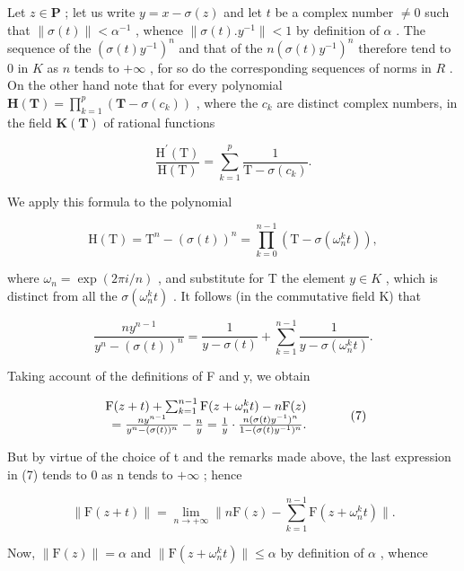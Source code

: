 Let \(z \in \mathbf{P}\) ; let us write \(y = x - \sigma(z)\) and let \(t\) be a complex number \(\neq 0\) such that \(\| \sigma(t) \| < \alpha^{-1}\) , whence \(\| \sigma(t).y^{-1} \| < 1\) by definition of \(\alpha\) . The sequence of the \((\sigma(t)y^{-1})^n\) and that of the \(n(\sigma(t)y^{-1})^n\) therefore tend to 0 in \(K\) as \(n\) tends to \(+\infty\) , for so do the corresponding sequences of norms in \(R\) . On the other hand note that for every polynomial \(\mathbf{H}(\mathbf{T}) = \prod_{k=1}^{p} (\mathbf{T} - \sigma(c_k))\) , where the \(c_k\) are distinct complex numbers, in the field \(\mathbf{K}(\mathbf{T})\) of rational functions

\[
\frac {\mathrm{H} ^ {\prime} (\mathrm{T})}{\mathrm{H} (\mathrm{T})} = \sum_ {k = 1} ^ {p} \frac {1}{\mathrm{T} - \sigma (c _ {k})}.\tag{5}
\]

We apply this formula to the polynomial

\[
\mathrm{H} (\mathrm{T}) = \mathrm{T} ^ {n} - (\sigma (t)) ^ {n} = \prod_ {k = 0} ^ {n - 1} \left(\mathrm{T} - \sigma \left(\omega_ {n} ^ {k} t\right)\right),
\]

where \(\omega_{n}=\exp(2\pi i/n)\) , and substitute for T the element \(y\in K\) , which is distinct from all the \(\sigma(\omega_{n}^{k}t)\) . It follows (in the commutative field K) that

\[
\frac {n y ^ {n - 1}}{y ^ {n} - (\sigma (t)) ^ {n}} = \frac {1}{y - \sigma (t)} + \sum_ {k = 1} ^ {n - 1} \frac {1}{y - \sigma \left(\omega_ {n} ^ {k} t\right)}.\tag{6}
\]

Taking account of the definitions of F and y, we obtain

\[
\begin{array}{r l} \mathrm{F} (z + t) + \sum_ {k = 1} ^ {n - 1} \mathrm{F} (z + \omega_ {n} ^ {k} t) - n \mathrm{F} (z) & \\ = \frac {n y ^ {n - 1}}{y ^ {n} - (\sigma (t)) ^ {n}} - \frac {n}{y} = \frac {1}{y} \cdot \frac {n (\sigma (t) y ^ {- 1}) ^ {n}}{1 - (\sigma (t) y ^ {- 1}) ^ {n}}. \end{array}\tag{7}
\]

But by virtue of the choice of t and the remarks made above, the last expression in (7) tends to 0 as n tends to \(+\infty\) ; hence

\[
\| \mathrm{F} (z + t) \| = \lim _ {n \to + \infty} \| n \mathrm{F} (z) - \sum_ {k = 1} ^ {n - 1} \mathrm{F} (z + \omega_ {n} ^ {k} t) \|.\tag{8}
\]

Now, \(\| \mathrm{F}(z)\| = \alpha\) and \(\| \mathrm{F}(z + \omega_n^kt)\| \leqslant \alpha\) by definition of \(\alpha\) , whence

